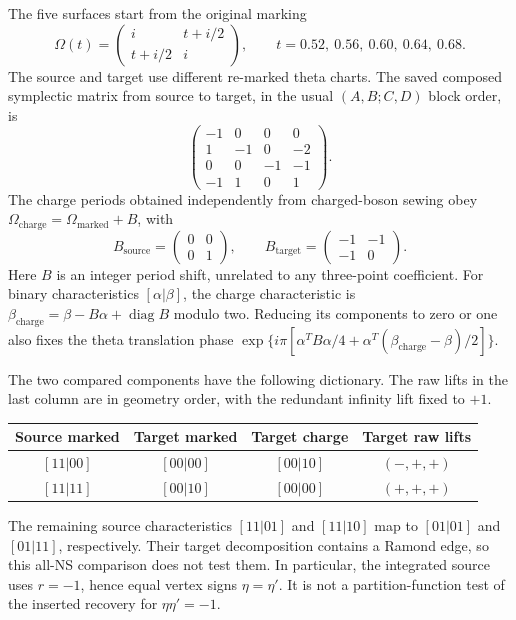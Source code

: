 The five surfaces start from the original marking
\begin{equation}
 \Omega(t)=\begin{pmatrix}i&t+i/2\\t+i/2&i\end{pmatrix},
 \qquad t=0.52,\ 0.56,\ 0.60,\ 0.64,\ 0.68.
 \label{eq:partition-surfaces}
\end{equation}
The source and target use different re-marked theta charts. The
saved composed symplectic matrix from source to target, in the
usual $(A,B;C,D)$ block order, is
\begin{equation}
 \begin{pmatrix}
 -1&0&0&0\\1&-1&0&-2\\0&0&-1&-1\\-1&1&0&1
 \end{pmatrix}.
 \label{eq:partition-symplectic}
\end{equation}
The charge periods obtained independently from charged-boson
sewing obey $\Omega_{\mathrm{charge}}=\Omega_{\mathrm{marked}}+B$,
with
\begin{equation}
 B_{\mathrm{source}}=\begin{pmatrix}0&0\\0&1\end{pmatrix},
 \qquad B_{\mathrm{target}}=\begin{pmatrix}-1&-1\\-1&0\end{pmatrix}.
 \label{eq:partition-period-branches}
\end{equation}
Here $B$ is an integer period shift, unrelated to any three-point
coefficient. For binary characteristics $[\alpha|\beta]$, the
charge characteristic is
$\beta_{\mathrm{charge}}=\beta-B\alpha+\operatorname{diag}B$
modulo two. Reducing its components to zero or one also fixes the
theta translation phase
$\exp\{i\pi[\alpha^TB\alpha/4+
\alpha^T(\beta_{\mathrm{charge}}-\beta)/2]\}$.

The two compared components have the following dictionary.
The raw lifts in the last column are in geometry order, with the
redundant infinity lift fixed to $+1$.
\begin{center}
\begin{tabular}{cccc}
\toprule
Source marked & Target marked & Target charge & Target raw lifts\\
\midrule
$[11|00]$ & $[00|00]$ & $[00|10]$ & $(-,+,+)$\\
$[11|11]$ & $[00|10]$ & $[00|00]$ & $(+,+,+)$\\
\bottomrule
\end{tabular}
\end{center}
The remaining source characteristics $[11|01]$ and $[11|10]$
map to $[01|01]$ and $[01|11]$, respectively. Their target
decomposition contains a Ramond edge, so this all-NS comparison
does not test them. In particular, the integrated source uses
$r=-1$, hence equal vertex signs $\eta=\eta'$. It is not a
partition-function test of the inserted recovery for
$\eta\eta'=-1$.

